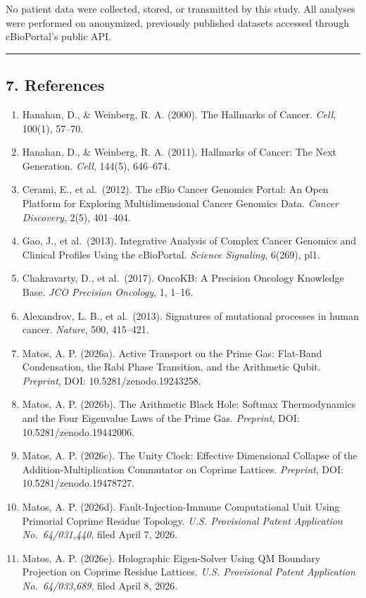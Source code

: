 \documentclass[
  11pt,
]{article}
\providecommand{\tightlist}{%
  \setlength{\itemsep}{0pt}\setlength{\parskip}{0pt}}
\begin{document}
No patient data were collected, stored, or transmitted by this study.
All analyses were performed on anonymized, previously published datasets
accessed through cBioPortal's public API.

\begin{center}\rule{0.5\linewidth}{0.5pt}\end{center}

\subsection{7. References}\label{references}

\begin{enumerate}
\def\labelenumi{\arabic{enumi}.}
\tightlist
\item
  Hanahan, D., \& Weinberg, R. A. (2000). The Hallmarks of Cancer.
  \emph{Cell}, 100(1), 57--70.
\item
  Hanahan, D., \& Weinberg, R. A. (2011). Hallmarks of Cancer: The Next
  Generation. \emph{Cell}, 144(5), 646--674.
\item
  Cerami, E., et al.~(2012). The cBio Cancer Genomics Portal: An Open
  Platform for Exploring Multidimensional Cancer Genomics Data.
  \emph{Cancer Discovery}, 2(5), 401--404.
\item
  Gao, J., et al.~(2013). Integrative Analysis of Complex Cancer
  Genomics and Clinical Profiles Using the cBioPortal. \emph{Science
  Signaling}, 6(269), pl1.
\item
  Chakravarty, D., et al.~(2017). OncoKB: A Precision Oncology Knowledge
  Base. \emph{JCO Precision Oncology}, 1, 1--16.
\item
  Alexandrov, L. B., et al.~(2013). Signatures of mutational processes
  in human cancer. \emph{Nature}, 500, 415--421.
\item
  Matos, A. P. (2026a). Active Transport on the Prime Gas: Flat-Band
  Condensation, the Rabi Phase Transition, and the Arithmetic Qubit.
  \emph{Preprint}, DOI: 10.5281/zenodo.19243258.
\item
  Matos, A. P. (2026b). The Arithmetic Black Hole: Softmax
  Thermodynamics and the Four Eigenvalue Laws of the Prime Gas.
  \emph{Preprint}, DOI: 10.5281/zenodo.19442006.
\item
  Matos, A. P. (2026c). The Unity Clock: Effective Dimensional Collapse
  of the Addition-Multiplication Commutator on Coprime Lattices.
  \emph{Preprint}, DOI: 10.5281/zenodo.19478727.
\item
  Matos, A. P. (2026d). Fault-Injection-Immune Computational Unit Using
  Primorial Coprime Residue Topology. \emph{U.S. Provisional Patent
  Application No.~64/031,440}, filed April 7, 2026.
\item
  Matos, A. P. (2026e). Holographic Eigen-Solver Using QM Boundary
  Projection on Coprime Residue Lattices. \emph{U.S. Provisional Patent
  Application No.~64/033,689}, filed April 8, 2026.
\end{enumerate}
\end{document}
